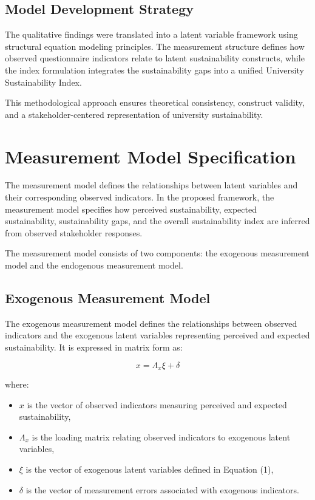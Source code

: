 \documentclass[11pt,a4paper]{article}
\begin{document}
\subsection{Model Development Strategy}

The qualitative findings were translated into a latent variable framework using structural equation modeling principles. The measurement structure defines how observed questionnaire indicators relate to latent sustainability constructs, while the index formulation integrates the sustainability gaps into a unified University Sustainability Index.

This methodological approach ensures theoretical consistency, construct validity, and a stakeholder-centered representation of university sustainability.

\section{Measurement Model Specification}

The measurement model defines the relationships between latent variables and their corresponding observed indicators. In the proposed framework, the measurement model specifies how perceived sustainability, expected sustainability, sustainability gaps, and the overall sustainability index are inferred from observed stakeholder responses.

The measurement model consists of two components: the exogenous measurement model and the endogenous measurement model.

\subsection{Exogenous Measurement Model}

The exogenous measurement model defines the relationships between observed indicators and the exogenous latent variables representing perceived and expected sustainability. It is expressed in matrix form as:

\begin{equation}
x = \Lambda_x \xi + \delta
\end{equation}

where:

\begin{itemize}
\item $x$ is the vector of observed indicators measuring perceived and expected sustainability,
\item $\Lambda_x$ is the loading matrix relating observed indicators to exogenous latent variables,
\item $\xi$ is the vector of exogenous latent variables defined in Equation (1),
\item $\delta$ is the vector of measurement errors associated with exogenous indicators.
\end{itemize}
\end{document}

